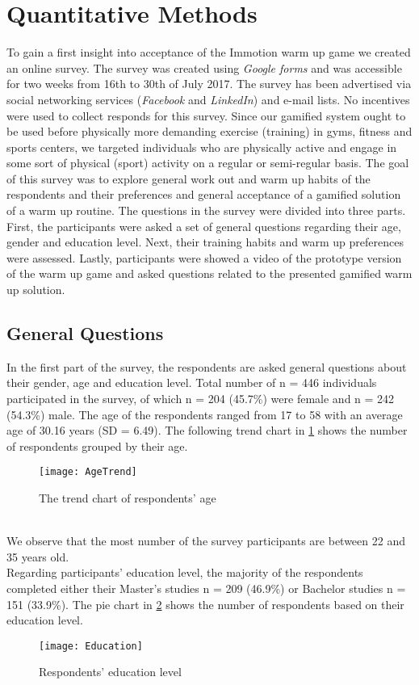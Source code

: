 \section{Quantitative Methods}
To gain a first insight into acceptance of the Immotion warm up game we created an online survey. The survey was created using \textit{Google forms} and was accessible for two weeks from 16th to 30th of July 2017. The survey has been advertised via social networking services (\textit{Facebook} and \textit{LinkedIn}) and e-mail lists. No incentives were used to collect responds for this survey. Since our gamified system ought to be used before physically more demanding exercise (training) in gyms, fitness and sports centers, we targeted individuals who are physically active and engage in some sort of physical (sport) activity on a regular or semi-regular basis. The goal of this survey was to explore general work out and warm up habits of the respondents and their preferences and general acceptance of a gamified solution of a warm up routine. The questions in the survey were divided into three parts. First, the participants were asked a set of general questions regarding their age, gender and education level. Next, their training habits and warm up preferences were assessed. Lastly, participants were showed a video of the prototype version of the warm up game and asked questions related to the presented gamified warm up solution. 

\subsection{General Questions}
In the first part of the survey, the respondents are asked general questions about their gender, age and education level. Total number of n = 446 individuals participated in the survey, of which n = 204 (45.7\%) were female and n = 242 (54.3\%) male. The age of the respondents ranged from 17 to 58 with an average age of 30.16 years (SD = 6.49). The  following trend chart in \ref{fig:AgeTrend} shows the number of respondents grouped by their age.\\
\begin{figure}[h]
    \centering
    \texttt{[image: AgeTrend]}
    \caption{The trend chart of respondents' age}
    \label{fig:AgeTrend}
\end{figure}\\
We observe that the most number of the survey participants are between 22 and 35 years old.\\
Regarding participants' education level, the majority of the respondents completed either their Master's studies n = 209 (46.9\%) or Bachelor studies n = 151 (33.9\%). The pie chart in \ref{fig:Education} shows the number of respondents based on their education level. 
\begin{figure}[h]
    \centering
    \texttt{[image: Education]}
    \caption{Respondents' education level}
    \label{fig:Education}
\end{figure}
